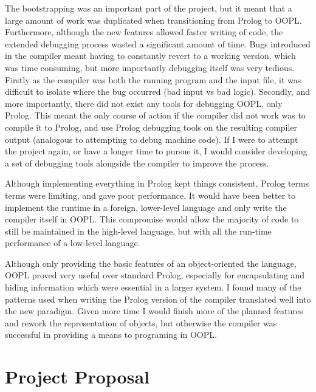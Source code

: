 \documentclass[12pt,a4paper,twoside,openright]{report}
\begin{document}
\bigskip

The bootstrapping was an important part of the project, but it meant that a large amount of work was duplicated when transitioning from Prolog to OOPL. Furthermore, although the new features allowed faster writing of code, the extended debugging process wasted a significant amount of time. Bugs introduced in the compiler meant having to constantly revert to a working version, which was time consuming, but more importantly debugging itself was very tedious. Firstly as the compiler was both the running program and the input file, it was difficult to isolate where the bug occurred (bad input vs bad logic). Secondly, and more importantly, there did not exist any tools for debugging OOPL, only Prolog. This meant the only course of action if the compiler did not work was to compile it to Prolog, and use Prolog debugging tools on the resulting compiler output (analogous to attempting to debug machine code). If I were to attempt the project again, or have a longer time to pursue it, I would consider developing a set of debugging tools alongside the compiler to improve the process.

\bigskip

Although implementing everything in Prolog kept things consistent, Prolog terms terms were limiting, and gave poor performance. It would have been better to implement the runtime in a foreign, lower-level language and only write the compiler itself in OOPL. This compromise would allow the majority of code to still be maintained in the high-level language, but with all the run-time performance of a low-level language.

\bigskip

Although only providing the basic features of an object-oriented the language, OOPL proved very useful over standard Prolog, especially for encapsulating and hiding information which were essential in a larger system. I found many of the patterns used when writing the Prolog version of the compiler translated well into the new paradigm. Given more time I would finish more of the planned features and rework the representation of objects, but otherwise the compiler was successful in providing a means to programing in OOPL.

{}


\appendix


\chapter{Project Proposal}


\end{document}
